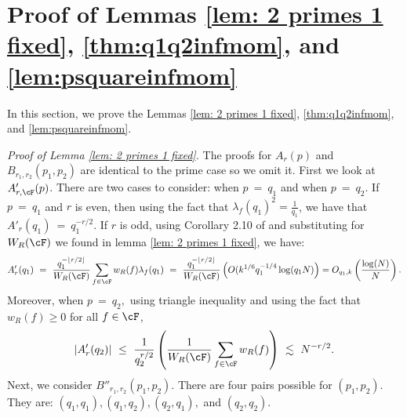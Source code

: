 \documentclass[11pt, reqno]{amsart}
\theoremstyle{definition}
\theoremstyle{remark}
\numberwithin{equation}{section}
\begin{document}
 \section{Proof of Lemmas \ref{lem: 2 primes 1 fixed}, \ref{thm:q1q2infmom}, and \ref{lem:psquareinfmom}} \label{appendix: Proof of Lemmas for computing As and Bs}
In this section, we prove the Lemmas \ref{lem: 2 primes 1 fixed}, \ref{thm:q1q2infmom}, and \ref{lem:psquareinfmom}. 

\noindent\textit{Proof of Lemma \ref{lem: 2 primes 1 fixed}. }
The proofs for $A_r(p)$ and $B_{r_1,r_2}(p_1,p_2)$ are identical to the prime case so we omit it. First we look at $A'_{r,\cF}(p)$. 
There are two cases to consider: when $p \ = \ q_1$ and when $p\ =\ q_2.$ If $p\ =\ q_1$ and $r$ is even, then using the fact that $\lambda_f(q_1)^2 = \frac{1}{q_1}$, we have that $A'_{r}(q_1)\  =\ q_1^{-r/2}.$ If $r$ is odd, using Corollary 2.10 of \cite{ILS2} and substituting for $W_R(\cF)$ we found in lemma \eqref{lem: 2 primes 1 fixed}, we have: \begin{align*}
    A'_{r}(q_1) \ =\ \frac{q_1^{-\lfloor r/2\rfloor}}{W_{R}(\cF)} \sum_{f\in\cF} w_R(f) \lambda_f(q_1) \ =\ \frac{q_1^{-\lfloor r/2\rfloor}}{W_{R}(\cF)} \left(O(k^{1/6}q_1^{-1/4}\log(q_1N)\right) = O_{q_1,k}\left(\frac{\log(N)}{N}\right).
\end{align*}
Moreover, when $p\ =\ q_2,$ using triangle inequality and using the fact that $w_R(f) \geq 0$ for all $f \in \cF$, 
$$|A'_r(q_2)|\ \leq \ \frac{1}{q_2^{r/2}}\left(\frac{1}{W_R(\cF)}\sum_{f\in\cF}w_R(f)\right)\ \lesssim \ N^{-r/2}.$$
Next, we consider $B''_{r_1,r_2}(p_1,p_2)$. There are four pairs possible for $(p_1,p_2).$ They are: $(q_1,q_1), (q_1,q_2), (q_2,q_1), $ and $(q_2,q_2)$. 
\end{document}
